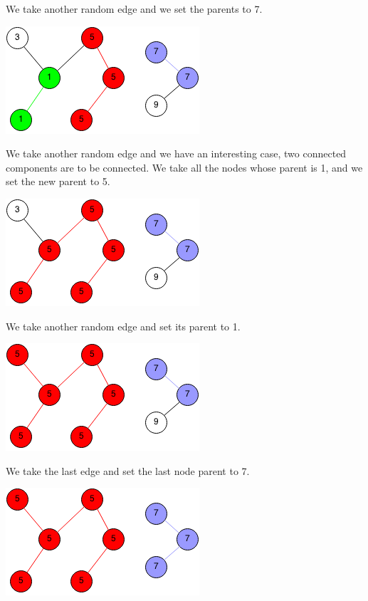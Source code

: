 \documentclass[11pt,oneside]{book}
\makeatletter
\def\maxwidth#1{\ifdim\Gin@nat@width>#1 #1\else\Gin@nat@width\fi}
\makeatother
\begin{document}
We take another random edge and we set the parents to 7.

\includegraphics[width=\maxwidth{\textwidth}]{connectedcomponents5.png}

We take another random edge and we have an interesting case, two connected components are to be connected. We take all the nodes whose parent is 1, and we set the new parent to 5.

\includegraphics[width=\maxwidth{\textwidth}]{connectedcomponents6.png}

We take another random edge and set its parent to 1.

\includegraphics[width=\maxwidth{\textwidth}]{connectedcomponents7.png}

We take the last edge and set the last node parent to 7.

\includegraphics[width=\maxwidth{\textwidth}]{connectedcomponents8.png}
\end{document}
